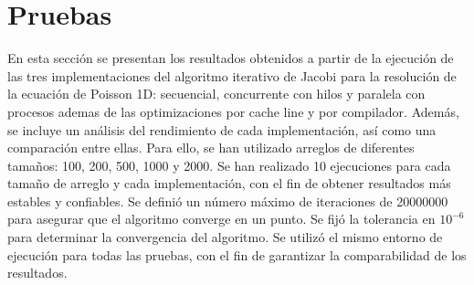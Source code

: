 \section{Pruebas}
\label{sec:Pruebas}

En esta sección se presentan los resultados obtenidos a partir de la ejecución de las tres implementaciones del algoritmo iterativo de Jacobi para la resolución de la ecuación de Poisson 1D: secuencial, 
concurrente con hilos y paralela con procesos ademas de las optimizaciones por cache line y por compilador. Además, se incluye un análisis del rendimiento de cada implementación, así como una comparación 
entre ellas. Para ello, se han utilizado arreglos de diferentes tamaños: 100, 200, 500, 1000 y 2000. Se han realizado 10 ejecuciones para cada tamaño de arreglo y 
cada implementación, con el fin de obtener resultados más estables y confiables. Se definió un número máximo de iteraciones de 20000000 para asegurar que el algoritmo converge en un punto. Se fijó la tolerancia en $10^{-6}$ para determinar la convergencia del algoritmo. Se utilizó el mismo entorno de ejecución para todas las pruebas, con el fin de garantizar la comparabilidad de los resultados.










